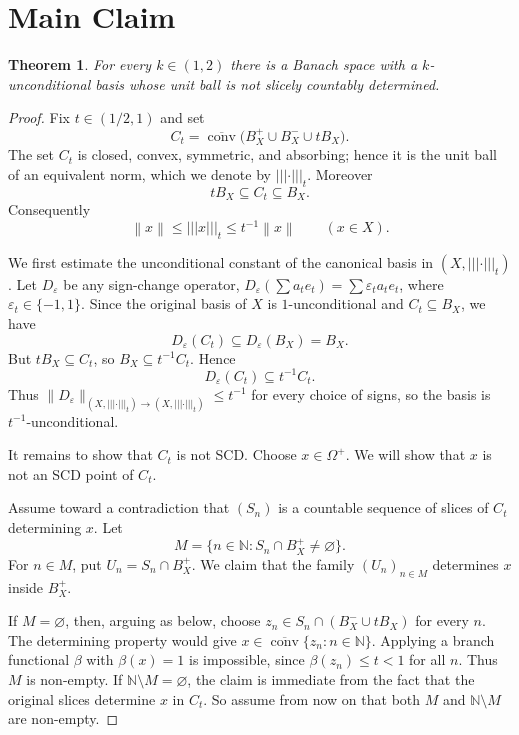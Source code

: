 \documentclass[11pt]{article}
\newtheorem{theorem}{Theorem}
\newcommand{\N}{\mathbb{N}}
\newcommand{\Ball}{B}
\newcommand{\wclosedconv}{\overline{\operatorname{conv}}}
\newcommand{\norm}[1]{\left\lVert #1 \right\rVert}
\newcommand{\vertiii}[1]{\left|\!\left|\!\left| #1 \right|\!\right|\!\right|}
\begin{document}
\section*{Main Claim}

\begin{theorem}
For every $k\in(1,2)$ there is a Banach space with a $k$-unconditional
basis whose unit ball is not slicely countably determined.
\end{theorem}

\begin{proof}
Fix $t\in(1/2,1)$ and set
\[
  C_t=\wclosedconv\bigl(\Ball_X^+\cup \Ball_X^- \cup t\Ball_X\bigr).
\]
The set $C_t$ is closed, convex, symmetric, and absorbing; hence it is the
unit ball of an equivalent norm, which we denote by $\vertiii{\cdot}_t$.
Moreover
\[
  t\Ball_X\subseteq C_t\subseteq \Ball_X.
\]
Consequently
\[
  \norm{x}\le \vertiii{x}_t\le t^{-1}\norm{x}\qquad (x\in X).
\]

We first estimate the unconditional constant of the canonical basis in
$(X,\vertiii{\cdot}_t)$. Let $D_\varepsilon$ be any sign-change operator,
$D_\varepsilon(\sum a_t e_t)=\sum \varepsilon_t a_t e_t$, where
$\varepsilon_t\in\{-1,1\}$. Since the original basis of $X$ is
$1$-unconditional and $C_t\subseteq\Ball_X$, we have
\[
  D_\varepsilon(C_t)\subseteq D_\varepsilon(\Ball_X)=\Ball_X.
\]
But $t\Ball_X\subseteq C_t$, so $\Ball_X\subseteq t^{-1}C_t$. Hence
\[
  D_\varepsilon(C_t)\subseteq t^{-1}C_t.
\]
Thus $\|D_\varepsilon\|_{(X,\vertiii{\cdot}_t)\to (X,\vertiii{\cdot}_t)}
\le t^{-1}$ for every choice of signs, so the basis is
$t^{-1}$-unconditional.

It remains to show that $C_t$ is not SCD. Choose $x\in\Omega^+$. We will
show that $x$ is not an SCD point of $C_t$.

Assume toward a contradiction that $(S_n)$ is a countable sequence of
slices of $C_t$ determining $x$. Let
\[
  M=\{n\in\N:S_n\cap \Ball_X^+\neq\varnothing\}.
\]
For $n\in M$, put $U_n=S_n\cap\Ball_X^+$. We claim that the family
$(U_n)_{n\in M}$ determines $x$ inside $\Ball_X^+$.

If $M=\varnothing$, then, arguing as below, choose
$z_n\in S_n\cap(\Ball_X^-\cup t\Ball_X)$ for every $n$. The determining
property would give
$x\in\wclosedconv\{z_n:n\in\N\}$. Applying a branch functional $\beta$
with $\beta(x)=1$ is impossible, since $\beta(z_n)\le t<1$ for all $n$.
Thus $M$ is non-empty. If $\N\setminus M=\varnothing$, the claim is
immediate from the fact that the original slices determine $x$ in $C_t$.
So assume from now on that both $M$ and $\N\setminus M$ are non-empty.


\end{proof}
\end{document}
